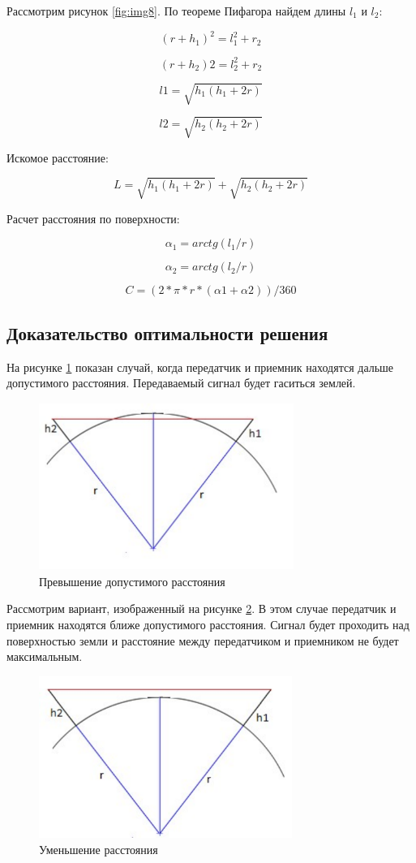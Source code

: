 Рассмотрим рисунок \ref{fig:img8}. По теореме Пифагора найдем длины $ l_1 $ и $ l_2 $: 

\[
(r+h_{1})^2=l_1^{2}+r_2
\]

\[
(r+h_{2})2=l_2^{2}+r_2
\]

\[
l1=\sqrt{h_{1}\left(h_{1}+2r\right)}
\]

\[
l2=\sqrt{h_{2}\left(h_{2}+2r\right)}
\]

Искомое расстояние: 

\[
L=\sqrt{h_{1}\left(h_{1}+2r\right)}+\sqrt{h_{2}\left(h_{2}+2r\right)}
\]

Расчет расстояния по поверхности: 

\[
\alpha_{1}=arctg(l_{1}/r)
\]

\[
\alpha_{2}=arctg(l_{2}/r)
\]

\[
C=(2*\pi*r*(\alpha1+\alpha2))/360
\]

\subsection{Доказательство оптимальности решения}
На рисунке \ref{fig:img9} показан случай, когда передатчик и приемник находятся дальше допустимого расстояния. Передаваемый сигнал будет гаситься землей.

\begin{figure}[H]
\centering{}\includegraphics[width=3.27in,height=2.15in]{img/kich_bur/image9}
\caption{Превышение допустимого расстояния}
\label{fig:img9}
\end{figure}

Рассмотрим вариант, изображенный на рисунке \ref{fig:img10}. В этом случае передатчик и приемник находятся ближе допустимого расстояния. Сигнал будет проходить над поверхностью земли и расстояние между передатчиком и приемником не будет максимальным. 

\begin{figure}[H]
\centering{}\includegraphics[width=3.25in,height=2.08in]{img/kich_bur/image10}
\caption{Уменьшение расстояния}
\label{fig:img10}
\end{figure}

